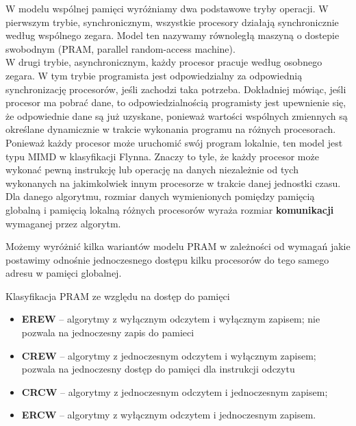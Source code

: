 W modelu wspólnej pamięci wyróżniamy dwa podstawowe tryby operacji. W pierwszym trybie, synchronicznym, wszystkie procesory działają synchronicznie według wspólnego zegara. Model ten nazywamy równoległą maszyną o dostepie swobodnym (PRAM, parallel random-access machine).\\
W drugi trybie, asynchronicznym, każdy procesor pracuje według osobnego zegara. W tym trybie programista jest odpowiedzialny za odpowiednią synchronizację procesorów, jeśli zachodzi taka potrzeba. Dokładniej mówiąc, jeśli procesor ma pobrać dane, to odpowiedzialnością programisty jest upewnienie się, że odpowiednie dane są już uzyskane, ponieważ wartości wspólnych zmiennych są określane dynamicznie w trakcie wykonania programu na różnych procesorach.\\

Ponieważ każdy procesor może uruchomić swój program lokalnie, ten model jest typu MIMD w klasyfikacji Flynna. Znaczy to tyle, że każdy procesor może wykonać pewną instrukcję lub operację na danych niezależnie od tych wykonanych na jakimkolwiek innym procesorze w trakcie danej jednostki czasu.\\

Dla danego algorytmu, rozmiar danych wymienionych pomiędzy pamięcią globalną i pamięcią lokalną różnych procesorów wyraża rozmiar \textbf{komunikacji} wymaganej przez algorytm.



Możemy wyróżnić kilka wariantów modelu PRAM w zależności od wymagań jakie postawimy odnośnie jednoczesnego dostępu kilku procesorów do tego samego adresu w pamięci globalnej.\\
\begin{definicja}{Klasyfikacja PRAM ze względu na dostęp do pamięci}
\begin{itemize}
\item\textbf{EREW} -- algorytmy z wyłącznym odczytem i wyłącznym zapisem; nie pozwala na jednoczesny zapis do pamieci\\
\item\textbf{CREW} -- algorytmy z jednoczesnym odczytem i wyłącznym zapisem; pozwala na jednoczesny  dostęp do pamięci dla instrukcji odczytu\\
\item\textbf{CRCW} -- algorytmy z jednoczesnym odczytem i jednoczesnym zapisem;\\
\item\textbf{ERCW} -- algorytmy z wyłącznym odczytem i jednoczesnym zapisem.\\
\end{itemize}
\end{definicja}

